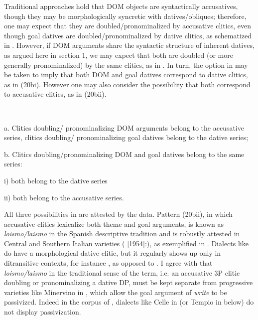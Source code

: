 \documentclass[output=paper]{langscibook}
\begin{document}
Traditional approaches hold that DOM objects are syntactically accusatives, though they may be morphologically syncretic with datives/obliques; therefore, one may expect that they are doubled/pronominalized by accusative clitics, even though goal datives are doubled/pronominalized by dative clitics, as schematized in . However, if DOM arguments share the syntactic structure of inherent datives, as argued here in section 1, we may expect that both are doubled (or more generally pronominalized) by the same clitics, as in . In turn, the option in  may be taken to imply that both DOM and goal datives correspond to dative clitics, as in (20bi). However one may also consider the possibility that both correspond to accusative clitics, as in (20bii). 

\ea\label{ex:manzini:}
{}\\
\z

a.  Clitics doubling/ pronominalizing DOM arguments belong to the accusative series, clitics doubling/ pronominalizing goal datives belong to the dative series;



b.  Clitics doubling/pronominalizing DOM and goal datives belong to the same series:



  i)  both belong to the dative series


  ii)  both belong to the accusative series.

All three possibilities in  are attested by the data. Pattern (20bii), in which accusative clitics lexicalize both theme and goal arguments, is known as \textit{loismo/laismo} in the Spanish descriptive tradition and is robustly attested in Central and Southern Italian varieties (\citealt{Rohlfs1969} [1954]:), as exemplified in . Dialects like  do have a morphological dative clitic, but it regularly shows up only in ditransitive contexts, for instance , as opposed to . I agree with \citet{Pineda2016} that \textit{loismo/laismo} in the traditional sense of the term, i.e. an accusative 3P clitic doubling or pronominalizing a dative DP, must be kept separate from progressive varieties like Minervino in , which allow the goal argument of \textit{write} to be passivized. Indeed in the corpus of \citet{ManziniSavoia2005}, dialects like Celle in  (or Tempio in  below) do not display passivization. 
\end{document}
